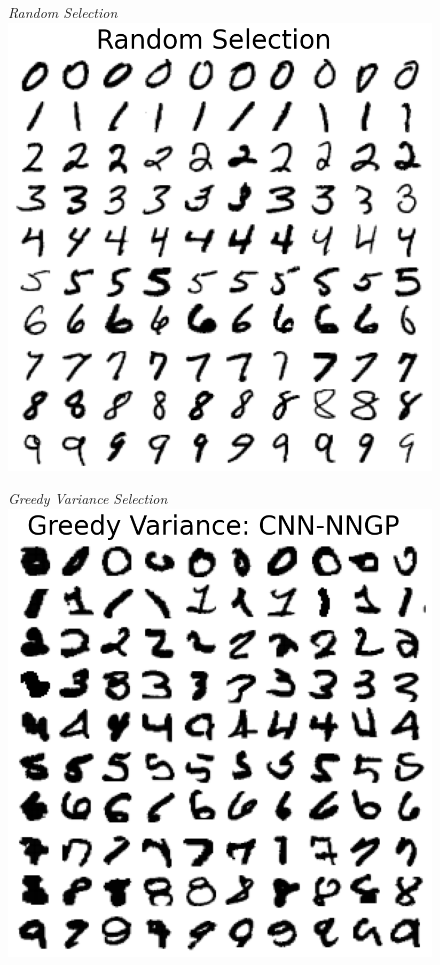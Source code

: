 \documentclass{article}
\numberwithin{equation}{section}
\begin{document}
\begin{figure}[h!]
\small
\centering
\begin{minipage}{.25\textwidth}
  \centering
  \textit{Random Selection}
  \includegraphics[width=\linewidth, trim={0 0 0 1.5cm},clip]{thesis_report/figures/mnist_inducing_point/random_mnist_inducing_point_selection.png}
\end{minipage}%
\begin{minipage}{.25\textwidth}
  \centering
  \textit{Greedy Variance Selection}
  \includegraphics[width=\linewidth, trim={0 0 0 1.5cm},clip]{thesis_report/figures/mnist_inducing_point/greedy_mnist_cnn_nngp_inducing_point_selection.png}

\end{minipage}
\end{figure}
\end{document}
